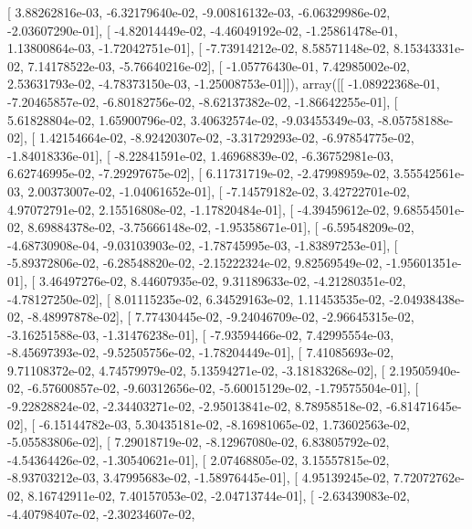 \documentclass{article}
\begin{document}
       [  3.88262816e-03,  -6.32179640e-02,  -9.00816132e-03,
         -6.06329986e-02,  -2.03607290e-01],
       [ -4.82014449e-02,  -4.46049192e-02,  -1.25861478e-01,
          1.13800864e-03,  -1.72042751e-01],
       [ -7.73914212e-02,   8.58571148e-02,   8.15343331e-02,
          7.14178522e-03,  -5.76640216e-02],
       [ -1.05776430e-01,   7.42985002e-02,   2.53631793e-02,
         -4.78373150e-03,  -1.25008753e-01]]), array([[ -1.08922368e-01,  -7.20465857e-02,  -6.80182756e-02,
         -8.62137382e-02,  -1.86642255e-01],
       [  5.61828804e-02,   1.65900796e-02,   3.40632574e-02,
         -9.03455349e-03,  -8.05758188e-02],
       [  1.42154664e-02,  -8.92420307e-02,  -3.31729293e-02,
         -6.97854775e-02,  -1.84018336e-01],
       [ -8.22841591e-02,   1.46968839e-02,  -6.36752981e-03,
          6.62746995e-02,  -7.29297675e-02],
       [  6.11731719e-02,  -2.47998959e-02,   3.55542561e-03,
          2.00373007e-02,  -1.04061652e-01],
       [ -7.14579182e-02,   3.42722701e-02,   4.97072791e-02,
          2.15516808e-02,  -1.17820484e-01],
       [ -4.39459612e-02,   9.68554501e-02,   8.69884378e-02,
         -3.75666148e-02,  -1.95358671e-01],
       [ -6.59548209e-02,  -4.68730908e-04,  -9.03103903e-02,
         -1.78745995e-03,  -1.83897253e-01],
       [ -5.89372806e-02,  -6.28548820e-02,  -2.15222324e-02,
          9.82569549e-02,  -1.95601351e-01],
       [  3.46497276e-02,   8.44607935e-02,   9.31189633e-02,
         -4.21280351e-02,  -4.78127250e-02],
       [  8.01115235e-02,   6.34529163e-02,   1.11453535e-02,
         -2.04938438e-02,  -8.48997878e-02],
       [  7.77430445e-02,  -9.24046709e-02,  -2.96645315e-02,
         -3.16251588e-03,  -1.31476238e-01],
       [ -7.93594466e-02,   7.42995554e-03,  -8.45697393e-02,
         -9.52505756e-02,  -1.78204449e-01],
       [  7.41085693e-02,   9.71108372e-02,   4.74579979e-02,
          5.13594271e-02,  -3.18183268e-02],
       [  2.19505940e-02,  -6.57600857e-02,  -9.60312656e-02,
         -5.60015129e-02,  -1.79575504e-01],
       [ -9.22828824e-02,  -2.34403271e-02,  -2.95013841e-02,
          8.78958518e-02,  -6.81471645e-02],
       [ -6.15144782e-03,   5.30435181e-02,  -8.16981065e-02,
          1.73602563e-02,  -5.05583806e-02],
       [  7.29018719e-02,  -8.12967080e-02,   6.83805792e-02,
         -4.54364426e-02,  -1.30540621e-01],
       [  2.07468805e-02,   3.15557815e-02,  -8.93703212e-03,
          3.47995683e-02,  -1.58976445e-01],
       [  4.95139245e-02,   7.72072762e-02,   8.16742911e-02,
          7.40157053e-02,  -2.04713744e-01],
       [ -2.63439083e-02,  -4.40798407e-02,  -2.30234607e-02,
\end{document}
